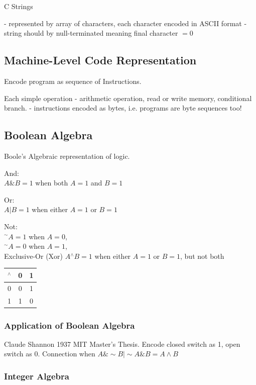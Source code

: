 \documentclass[10pt]{amsart}
\begin{document}
C Strings

- represented by array of characters, each character encoded in ASCII format 
- string should by null-terminated meaning final character $=0$

\subsection{Machine-Level Code Representation}

Encode program as sequence of Instructions. 

Each simple operation
- arithmetic operation, read or write memory, conditional branch.
- instructions encoded as bytes, 
i.e. programs are byte sequences too!

\subsection{Boolean Algebra}

Boole's Algebraic representation of logic.

And: \\
$A \& B = 1$ when both $A=1$ and $B=1$

Or: \\
$A | B = 1$ when either $A=1$ or $B=1$

Not: \\
${}^{\sim}A= 1$ when $A=0$, \\
${}^{\sim}A= 0$ when $A=1$, \\

Exclusive-Or (Xor)
$A {}^{\wedge} B = 1$ when either $A=1$ or $B=1$, but not both

\begin{center}
	\begin{tabular}{ l | c  c }
		${}^{\wedge}$ & 0 & 1 \\ \hline 
		0 & 0 & 1 \\
		1 & 1 & 0
	\end{tabular}
\end{center}

\subsubsection{Application of Boolean Algebra}

Claude Shannon 1937 MIT Master's Thesis. Encode closed switch as 1, open switch as 0. Connection when $A\& \sim B | \sim A \& B = A \wedge B$

\subsubsection{Integer Algebra}
\end{document}
